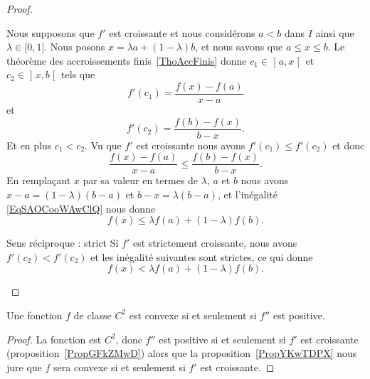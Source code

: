\begin{proof}
\begin{subproof}
             Nous supposons que \( f'\) est croissante et nous considérons \( a<b\) dans \( I\) ainsi que \( \lambda\in \mathopen[ 0 , 1 \mathclose]\). Nous posons \( x=\lambda a+(1-\lambda)b\), et nous savons que \( a\leq x\leq b\). Le théorème des accroissements finis~\ref{ThoAccFinis} donne \( c_1\in\mathopen] a , x \mathclose[\) et \( c_2\in \mathopen] x , b \mathclose[\) tels que
                 \begin{equation}
                     f'(c_1)=\frac{ f(x)-f(a) }{ x-a }
                 \end{equation}
                 et
                 \begin{equation}
                     f'(c_2)=\frac{ f(b)-f(x) }{ b-x }.
                 \end{equation}
                 Et en plus \( c_1<c_2\). Vu que \( f'\) est croissante nous avons \( f'(c_1)\leq f'(c_2)\) et donc
                 \begin{equation}       \label{EqSAOCooWAwClQ}
                     \frac{ f(x)-f(a) }{ x-a }\leq\frac{ f(b)-f(x) }{ b-x }.
                 \end{equation}
                 En remplaçant \( x\) par sa valeur en termes de \( \lambda\), \( a\) et \( b\) nous avons \( x-a=(1-\lambda)(b-a)\) et \( b-x=\lambda(b-a)\), et l'inégalité \eqref{EqSAOCooWAwClQ} nous donne
                 \begin{equation}
                     f(x)\leq \lambda f(a)+(1-\lambda)f(b).
                 \end{equation}
             \item[Sens réciproque : strict]
                 Si \( f'\) est strictement croissante, nous avons \( f'(c_2)<f'(c_2)\) et les inégalité suivantes sont strictes, ce qui donne
                 \begin{equation}
                     f(x)< \lambda f(a)+(1-\lambda)f(b).
                 \end{equation}
    \end{subproof}
\end{proof}

\begin{theorem} \label{ThoGXjKeYb}
    Une fonction \( f\) de classe \( C^2\) est convexe si et seulement si \( f''\) est positive.
\end{theorem}

\begin{proof}
    La fonction est \( C^2\), donc \( f''\) est positive si et seulement si \( f'\) est croissante (proposition~\ref{PropGFkZMwD}) alors que la proposition~\ref{PropYKwTDPX} nous jure que \( f\) sera convexe si et seulement si \( f'\) est croissante.
\end{proof}

